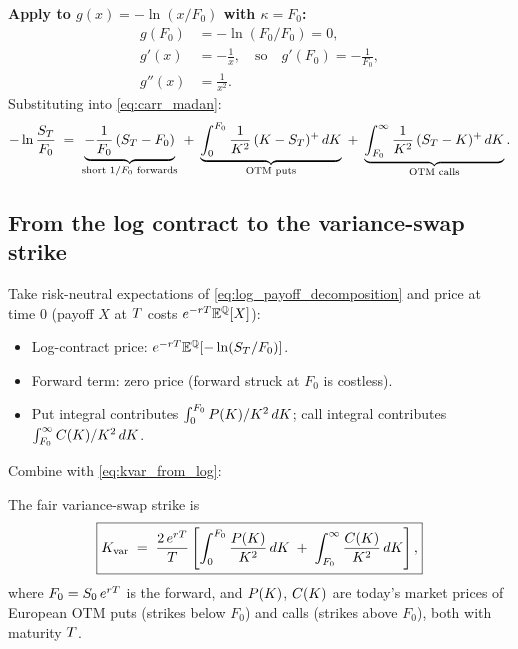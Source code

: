 \medskip
\noindent
\textbf{Apply to $g(x)=-\ln(x/F_0)$ with $\kappa=F_0$:}
\begin{align*}
  g(F_0) &= -\ln(F_0/F_0) = 0, \\
  g'(x)  &= -\frac{1}{x}, \quad\text{so}\quad
             g'(F_0) = -\frac{1}{F_0}, \\
  g''(x) &= \frac{1}{x^2}.
\end{align*}
Substituting into \cref{eq:carr_madan}:
\begin{equation}
  -\ln\frac{S_T}{F_0}
  \;=\;
  \underbrace{-\frac{1}{F_0}\,(S_T - F_0)}_{\text{short
    $1/F_0$ forwards}}
  \;+\;
  \underbrace{\int_0^{F_0}
    \frac{1}{K^2}\,(K - S_T)^+\,dK}_{\text{OTM puts}}
  \;+\;
  \underbrace{\int_{F_0}^{\infty}
    \frac{1}{K^2}\,(S_T - K)^+\,dK}_{\text{OTM calls}}.
  \label{eq:log_payoff_decomposition}
\end{equation}

\subsection{From the log contract to the variance-swap strike}
\label{subsec:varswap_formula}

Take risk-neutral expectations of \cref{eq:log_payoff_decomposition}
and price at time 0 (payoff $X$ at $T$ costs
$e^{-rT}\mathbb{E}^{\mathbb{Q}}[X]$):
\begin{itemize}
  \item Log-contract price: $e^{-rT}\mathbb{E}^{\mathbb{Q}}[-\ln(S_T/F_0)]$.
  \item Forward term: zero price (forward struck at $F_0$ is costless).
  \item Put integral contributes $\int_0^{F_0}P(K)/K^2\,dK$;
    call integral contributes $\int_{F_0}^{\infty}C(K)/K^2\,dK$.
\end{itemize}
Combine with \cref{eq:kvar_from_log}:

\begin{keyfactbox}
\label{fact:varswap_full}
The fair variance-swap strike is
\begin{equation}
  \boxed{
  K_{\text{var}}
  \;=\;
  \frac{2\,e^{r T}}{T}\left[
    \int_0^{F_0}
      \frac{P(K)}{K^2}\,dK
    \;+\;
    \int_{F_0}^{\infty}
      \frac{C(K)}{K^2}\,dK
  \right],
  }
  \label{eq:varswap_strike}
\end{equation}
where $F_0 = S_0\,e^{rT}$ is the forward, and
$P(K)$, $C(K)$ are today's market prices of
European OTM puts (strikes below $F_0$) and calls (strikes above
$F_0$), both with maturity $T$.
\end{keyfactbox}

